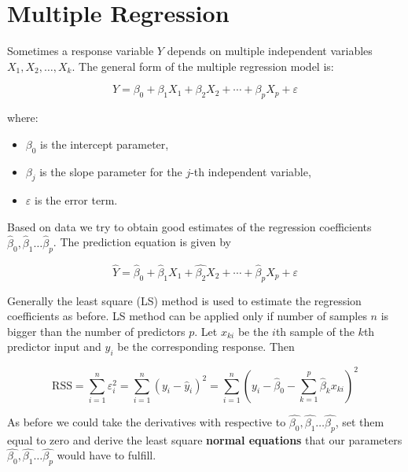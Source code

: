 \documentclass[twoside]{book}
\begin{document}
\section{Multiple Regression}

Sometimes a response variable $Y$ depends on multiple independent variables $X_1, X_2, \ldots, X_k$. The general form of the multiple regression model is:
\begin{textbox}
\begin{equation*}
Y = \beta_0 + \beta_1 X_{1} + \beta_2 X_{2} + \cdots + \beta_p X_{p} + \varepsilon
\end{equation*}
\end{textbox}
where:
\begin{itemize}
    \item $\beta_0$ is the intercept parameter,
    \item $\beta_j$ is the slope parameter for the $j$-th independent variable,
    \item $\varepsilon$ is the error term.
\end{itemize}

Based on data we try to obtain good estimates of the regression coefficients $\hat{\beta}_0,\hat{\beta}_1 \dots \hat{\beta}_p$. The prediction equation is given by
\begin{textbox}
$$\hat{Y} = \hat{\beta}_0 + \hat{\beta}_1 X_{1} + \hat{\beta_2} X_{2} + \cdots + \hat{\beta}_p X_{p} + \varepsilon$$
\end{textbox}
Generally the least square (LS) method is used to estimate the regression coefficients as before. LS method can be applied only if number of samples $n$ is bigger than the number of predictors $p$. Let $x_{ki}$ be the $i$th sample of the $k$th predictor input and $y_i$ be the corresponding response. Then
\begin{textbox}
$$\text{RSS} = \sum_{i=1}^{n} \varepsilon_i^2 = \sum_{i=1}^{n} (y_i - \hat{y}_i)^2 = \sum_{i=1}^{n} \left( y_i - \hat{\beta}_0 - \sum_{k=1}^{p}\hat{\beta}_k x_{ki}\right)^2$$
\end{textbox}

As before we could take the derivatives with respective to $\hat{\beta_0},\hat{\beta_1} \dots \hat{\beta_p}$, set them equal to zero and derive the least square \textbf{normal equations} that our parameters $\hat{\beta_0},\hat{\beta_1} \dots \hat{\beta_p}$ would have to fulfill.
\end{document}
